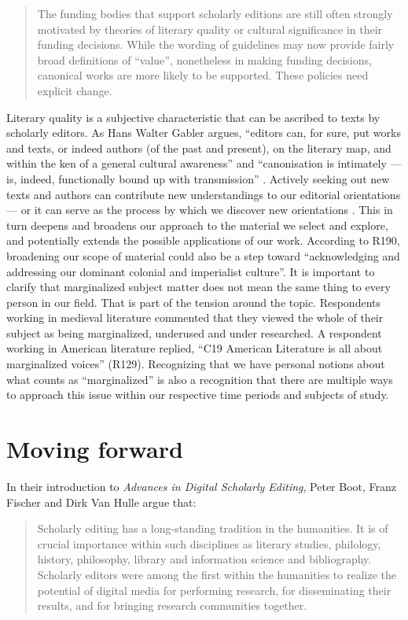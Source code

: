 \begin{paper}
\begin{quote}
The funding bodies that support scholarly editions are still often
strongly motivated by theories of literary quality or cultural
significance in their funding decisions. While the wording of guidelines
may now provide fairly broad definitions of ``value'', nonetheless in
making funding decisions, canonical works are more likely to be
supported. These policies need explicit change.
\end{quote}
Literary quality is a subjective characteristic that can be ascribed to
texts by scholarly editors. As Hans Walter Gabler argues, ``editors can,
for sure, put works and texts, or indeed authors (of the past and
present), on the literary map, and within the ken of a general cultural
awareness'' and ``canonisation is intimately --- is, indeed,
functionally bound up with transmission'' \citeyearpar[366]{gabler_text_2018}. Actively seeking
out new texts and authors can contribute new understandings to our
editorial orientations --- or it can serve as the process by which we
discover new orientations \citep[see e.g.][]{van_hulle_orientations_2015}.
This in turn deepens and broadens our approach to the material we select
and explore, and potentially extends the possible applications of our
work. According to R190, broadening our scope of material could also be
a step toward ``acknowledging and addressing our dominant colonial and
imperialist culture''. It is important to clarify that marginalized
subject matter does not mean the same thing to every person in our
field. That is part of the tension around the topic. Respondents working
in medieval literature commented that they viewed the whole of their
subject as being marginalized, underused and under researched. A
respondent working in American literature replied, ``C19 American
Literature is all about marginalized voices'' (R129). Recognizing that
we have personal notions about what counts as ``marginalized'' is also a
recognition that there are multiple ways to approach this issue within
our respective time periods and subjects of study.
\section*{Moving forward}

In their introduction to \emph{Advances in Digital Scholarly Editing},
Peter Boot, Franz Fischer and Dirk Van Hulle argue that:

\begin{quote}
Scholarly editing has a long-standing tradition in the humanities. It is
of crucial importance within such disciplines as literary studies,
philology, history, philosophy, library and information science and
bibliography. Scholarly editors were among the first within the
humanities to realize the potential of digital media for performing
research, for disseminating their results, and for bringing research
communities together.


\end{quote}
\end{paper}
